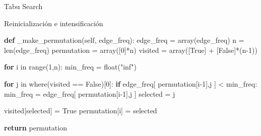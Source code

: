 \documentclass[ignorenonframetext,]{beamer}
\newenvironment{Shaded}{}{}
\newcommand{\KeywordTok}[1]{\textcolor[rgb]{0.00,0.44,0.13}{\textbf{{#1}}}}
\newcommand{\DataTypeTok}[1]{\textcolor[rgb]{0.56,0.13,0.00}{{#1}}}
\newcommand{\DecValTok}[1]{\textcolor[rgb]{0.25,0.63,0.44}{{#1}}}
\newcommand{\StringTok}[1]{\textcolor[rgb]{0.25,0.44,0.63}{{#1}}}
\newcommand{\OtherTok}[1]{\textcolor[rgb]{0.00,0.44,0.13}{{#1}}}
\newcommand{\NormalTok}[1]{{#1}}
\begin{document}
\begin{frame}[fragile]{Tabu Search}

\begin{block}{Reinicialización e intensificación}

\begin{Shaded}
\begin{Highlighting}[]

\KeywordTok{def} \NormalTok{_make_permutation(}\OtherTok{self}\NormalTok{, edge_freq):}
    \NormalTok{edge_freq = array(edge_freq)}
    \NormalTok{n = }\DataTypeTok{len}\NormalTok{(edge_freq)}
    \NormalTok{permutation = array([}\DecValTok{0}\NormalTok{]*n)}
    \NormalTok{visited = array([}\OtherTok{True}\NormalTok{] + [}\OtherTok{False}\NormalTok{]*(n}\DecValTok{-1}\NormalTok{))}

    \KeywordTok{for} \NormalTok{i in }\DataTypeTok{range}\NormalTok{(}\DecValTok{1}\NormalTok{,n):}
        \NormalTok{min_freq = }\DataTypeTok{float}\NormalTok{(}\StringTok{"inf"}\NormalTok{)}

        \KeywordTok{for} \NormalTok{j in where(visited == }\OtherTok{False}\NormalTok{)[}\DecValTok{0}\NormalTok{]:}
            \KeywordTok{if} \NormalTok{edge_freq[ permutation[i}\DecValTok{-1}\NormalTok{],j ] < min_freq:}
                \NormalTok{min_freq = edge_freq[ permutation[i}\DecValTok{-1}\NormalTok{],j ]}
                \NormalTok{selected = j}

        \NormalTok{visited[selected] = }\OtherTok{True}
        \NormalTok{permutation[i] = selected}

    \KeywordTok{return} \NormalTok{permutation}
\end{Highlighting}
\end{Shaded}

\end{block}

\end{frame}
\end{document}
